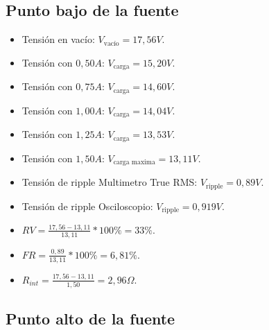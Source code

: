     \saltoPag{}

    \subsection{Punto bajo de la fuente}


    \begin{itemize}
        \item Tensión en vacío: $V_{\text{vacío}} = 17,56 V$.
        \item Tensión con $0,50 A$: $V_{\text{carga}} = 15,20 V$.
        \item Tensión con $0,75 A$: $V_{\text{carga}} = 14,60 V$.
        \item Tensión con $1,00 A$: $V_{\text{carga}} = 14,04 V$.
        \item Tensión con $1,25 A$: $V_{\text{carga}} = 13,53 V$.
        \item Tensión con $1,50 A$: $V_{\text{carga maxima}} = 13,11 V$.
        \item Tensión de ripple Multimetro True RMS: $V_{\text{ripple}} = 0,89 V$. 
        \item Tensión de ripple Osciloscopio: $V_{\text{ripple}} = 0,919 V$.
    \end{itemize}

    
    \begin{itemize}
        \item $RV = \frac{17,56 - 13,11}{13,11} * 100\% = 33\%$.
        \item $FR = \frac{0,89}{13,11} * 100\% = 6,81\%$.
        \item $R_{int} = \frac{17,56 - 13,11}{1,50} = 2,96 \Omega$.
    \end{itemize}

    \subsection{Punto alto de la fuente}
    


